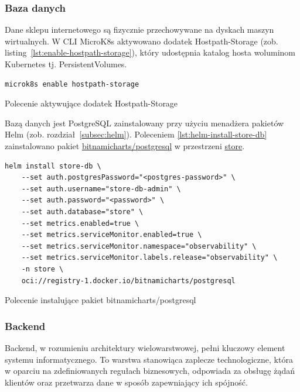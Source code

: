 \subsubsection{Baza danych}\label{subsubsec:baza-danych}

Dane sklepu internetowego są fizycznie przechowywane na dyskach maszyn wirtualnych.
W CLI MicroK8s aktywowano dodatek Hostpath-Storage (zob. listing~\ref{lst:enable-hostpath-storage}), który udostępnia katalog hosta woluminom Kubernetes tj. PersistentVolumes.

\begin{listing}[H]
    \begin{verbatim}
microk8s enable hostpath-storage
    \end{verbatim}
    \caption{Polecenie aktywujące dodatek Hostpath-Storage}
    \label{lst:enable-hostpath-storage}
\end{listing}

\noindent Bazą danych jest PostgreSQL zainstalowany przy użyciu menadżera pakietów Helm (zob. rozdział~\ref{subsec:helm}).
Poleceniem \autoref{lst:helm-install-store-db} zainstalowano pakiet \url{bitnamicharts/postgresql} w przestrzeni \url{store}.

\begin{listing}[H]
    \begin{verbatim}
helm install store-db \
    --set auth.postgresPassword="<postgres-password>" \
    --set auth.username="store-db-admin" \
    --set auth.password="<password>" \
    --set auth.database="store" \
    --set metrics.enabled=true \
    --set metrics.serviceMonitor.enabled=true \
    --set metrics.serviceMonitor.namespace="observability" \
    --set metrics.serviceMonitor.labels.release="observability" \
    -n store \
    oci://registry-1.docker.io/bitnamicharts/postgresql
    \end{verbatim}
    \caption{Polecenie instalujące pakiet bitnamicharts/postgresql}
    \label{lst:helm-install-store-db}
\end{listing}

\subsubsection{Backend}

Backend, w rozumieniu architektury wielowarstwowej, pełni kluczowy element systemu informatycznego.
To warstwa stanowiąca zaplecze technologiczne, która w oparciu na zdefiniowanych regułach biznesowych, odpowiada za obsługę żądań klientów oraz przetwarza dane w sposób zapewniający ich spójność.

